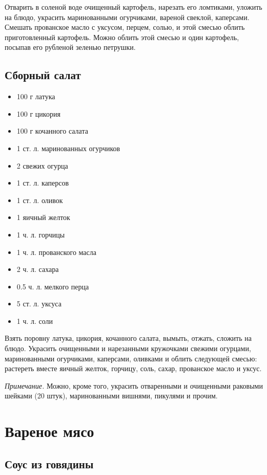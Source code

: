 Отварить в соленой воде очищенный картофель, нарезать его ломтиками, уложить на блюдо, украсить маринованными огурчиками, вареной свеклой, каперсами. Смешать прованское масло с уксусом, перцем, солью, и этой смесью облить приготовленный картофель. Можно облить этой смесью и один картофель, посыпав его рубленой зеленью петрушки.

\subsection{Сборный салат}

\begin{itemize}
	\item 100 г латука 
    \item 100 г цикория 
    \item 100 г кочанного салата 
    \item 1 ст. л. маринованных огурчиков 
    \item 2 свежих огурца 
    \item 1 ст. л. каперсов 
    \item 1 ст. л. оливок 
    \item 1 яичный желток 
    \item 1 ч. л. горчицы 
    \item 1 ч. л. прованского масла 
    \item 2 ч. л. сахара 
    \item 0.5 ч. л. мелкого перца 
    \item 5 ст. л. уксуса 
    \item 1 ч. л. соли
\end{itemize}

Взять поровну латука, цикория, кочанного салата, вымыть, отжать, сложить на блюдо. Украсить очищенными и нарезанными кружочками свежими огурцами, маринованными огурчиками, каперсами, оливками и облить следующей смесью: растереть вместе яичный желток, горчицу, соль, сахар, прованское масло и уксус.

\emph{Примечание.} Можно, кроме того, украсить отваренными и очищенными раковыми шейками (20 штук), маринованными вишнями, пикулями и прочим.

\newpage
\section{Вареное мясо}

\subsection{Соус из говядины}

